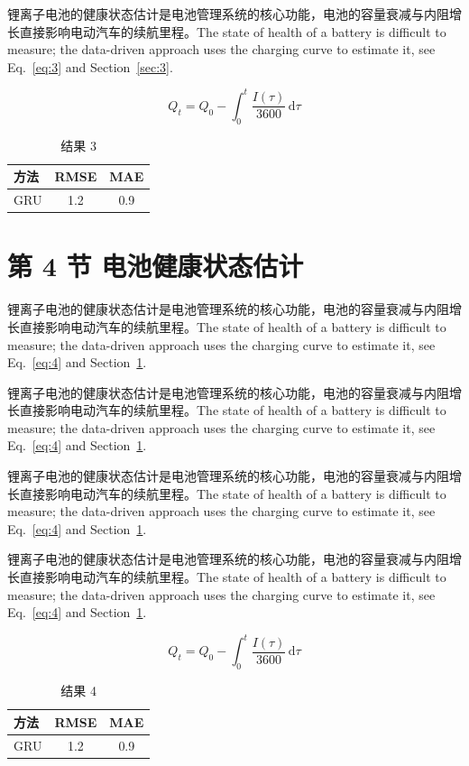 \documentclass[UTF8,fontset=mac]{ctexart}
\begin{document}
锂离子电池的健康状态估计是电池管理系统的核心功能，电池的容量衰减与内阻增长直接影响电动汽车的续航里程\cite{a2020}。The state of health of a battery is difficult to measure; the data-driven approach uses the charging curve to estimate it, see Eq.~\eqref{eq:3} and Section~\ref{sec:3}.

\begin{equation}\label{eq:3}
  Q_t = Q_0 - \int_0^t \frac{I(\tau)}{3600}\,\mathrm{d}\tau
\end{equation}
\begin{table}[h]\centering\begin{tabular}{lcc}\toprule 方法 & RMSE & MAE\\\midrule GRU & 1.2 & 0.9\\\bottomrule\end{tabular}\caption{结果 3}\end{table}

\section{第 4 节 电池健康状态估计}\label{sec:4}
锂离子电池的健康状态估计是电池管理系统的核心功能，电池的容量衰减与内阻增长直接影响电动汽车的续航里程\cite{a2020}。The state of health of a battery is difficult to measure; the data-driven approach uses the charging curve to estimate it, see Eq.~\eqref{eq:4} and Section~\ref{sec:4}.

锂离子电池的健康状态估计是电池管理系统的核心功能，电池的容量衰减与内阻增长直接影响电动汽车的续航里程\cite{a2020}。The state of health of a battery is difficult to measure; the data-driven approach uses the charging curve to estimate it, see Eq.~\eqref{eq:4} and Section~\ref{sec:4}.

锂离子电池的健康状态估计是电池管理系统的核心功能，电池的容量衰减与内阻增长直接影响电动汽车的续航里程\cite{a2020}。The state of health of a battery is difficult to measure; the data-driven approach uses the charging curve to estimate it, see Eq.~\eqref{eq:4} and Section~\ref{sec:4}.

锂离子电池的健康状态估计是电池管理系统的核心功能，电池的容量衰减与内阻增长直接影响电动汽车的续航里程\cite{a2020}。The state of health of a battery is difficult to measure; the data-driven approach uses the charging curve to estimate it, see Eq.~\eqref{eq:4} and Section~\ref{sec:4}.

\begin{equation}\label{eq:4}
  Q_t = Q_0 - \int_0^t \frac{I(\tau)}{3600}\,\mathrm{d}\tau
\end{equation}
\begin{table}[h]\centering\begin{tabular}{lcc}\toprule 方法 & RMSE & MAE\\\midrule GRU & 1.2 & 0.9\\\bottomrule\end{tabular}\caption{结果 4}\end{table}
\end{document}
